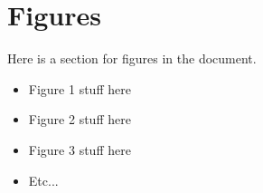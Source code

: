 \chapter{Figures}
Here is a section for figures in the document.

\begin{itemize}
\item Figure 1 stuff here
\item Figure 2 stuff here
\item Figure 3 stuff here
\item Etc...
\end{itemize}

